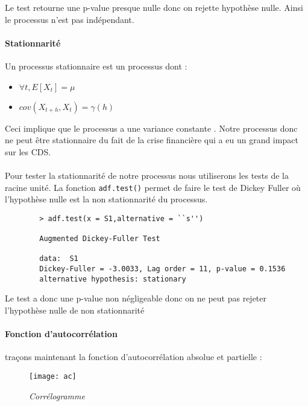         Le test retourne une p-value presque nulle donc on rejette hypothèse nulle.
        Ainsi le processus n'est pas indépendant.

        \paragraph{Stationnarité}
        Un processus stationnaire est un processus dont :
        \begin{itemize}
            \item $\forall t,E[X_t]=\mu$  
            \item $cov(X_{t+h},X_t)=\gamma(h)$ 
        \end{itemize}
        Ceci implique que le processus a une variance constante .
        Notre processus donc ne peut être stationnaire du fait de la crise
        financière qui a eu un grand impact sur les CDS. 

        \paragraph{} Pour tester la stationnarité de notre processus nous utiliserons les tests
        de la racine unité. 
        La fonction \verb+adf.test()+ permet de faire le test de Dickey Fuller
        où l'hypothèse nulle est la non stationnarité du processus.  
        \begin{verbatim}
        > adf.test(x = S1,alternative = ``s'')

        Augmented Dickey-Fuller Test

        data:  S1
        Dickey-Fuller = -3.0033, Lag order = 11, p-value = 0.1536
        alternative hypothesis: stationary
        \end{verbatim}

        Le test a donc une p-value non négligeable donc on ne peut pas rejeter
        l'hypothèse nulle de non stationnarité 
        
        \paragraph{Fonction d'autocorrélation} traçons maintenant la fonction
        d'autocorrélation absolue et partielle :
        \begin{figure}[H]
            \centering 
            \label{fig:ac} 
            \texttt{[image: ac]} 
            \caption{\it Corrélogramme } 
        \end{figure} 

